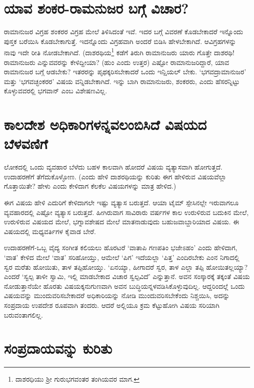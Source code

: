 \section*{ಯಾವ ಶಂಕರ-ರಾಮನುಜರ ಬಗ್ಗೆ ವಿಚಾರ?}

ರಾಮಾನುಜರ ವಿಗ್ರಹ ಶಂಕರರ ವಿಗ್ರಹ ಮೇಲೆ ತಿಳಿಸಿದಂತೆ ಇವೆ. ಇದರ ಬಗ್ಗೆ ವಿವರಣೆ ಕೊಡಬೇಕಾದರೆ ಇನ್ನೊಂದು ಪುಸ್ತಕ ಬರೆಯಿಸಿ ಕೊಡಬೇಕಾಗುತ್ತೆ. ಇದನ್ನೊಂದು ವಿಗ್ರಹವಾಗಿ ಅಂದರೆ ಬಿಡಿಸಿ ಹೇಳಬೇಕಾಗಿದೆ. ಆವಿಗ್ರಹಗಳನ್ನು ನಾವು ಇದೇ ರೀತಿ ನೋಡಬೇಕಾಗಿದೆ. (ದಾಶರಥಿಯ\footnote{ದಾಶರಧಿಯು ಶ್ರೀ ಗುರುಭಗವಂತರ ತಂಗಿಯವರ ಮಾಗ.} ಕಡೆಗೆ ತಿರುಗಿ ರಾಮಾನುಜರು ಯಾರು ಗೊತ್ತೇ ದಾಶರಥಿ! ರಾಮಾನುಜರು ಎನ್ನುವವರನ್ನು ಕೇಳಿದ್ದೀಯಾ? (ಹುಂ ಎಂದು ಉತ್ತರ) ಎಷ್ಟೋ ರಾಮಾನುಜರಿದ್ದಾರೆ, ಯಾವ ರಾಮಾನುಜರ ಬಗ್ಗೆ ಆಡಬೇಕು? ಇತರರನ್ನು  ಪೃಥಕ್ಕರಿಸಬೇಕಾದರೆ ಒಂದು ಇನ್ಷಿಯಲ್ ಬೇಕು. `ಭಗವದ್ರಾಮಾನುಜರ' ಮತ್ತು `ಭಗವಚ್ಛಂಕರರ' ವಿಷಯ ವನ್ನಿಡಬೇಕಾಗಿದೆ. ಇನ್ನು ಬಾಗಿ ರಾಮಾನುಜರು, ಶಂಕರರು, ಎಂದು ಹೆಸರನ್ನಿಟ್ಟು ಕೊಳ್ಳುವವರಲ್ಲಿ ಭಗವಾನ್ ಎಂಬ ವಿಶೇಷಣವಿಲ್ಲ.

\section*{ಕಾಲದೇಶ ಅಧಿಕಾರಿಗಳನ್ನವಲಂಬಿಸಿದೆ ವಿಷಯದ ಬೆಳವಣಿಗೆ}

ಲೋಕದಲ್ಲಿ ಒಂದು ವ್ಯವಹಾರ ಬೆಳೆದು ಬಹಳ ಕಾಲವಾಗಿ ಹೋದರೆ ವಿಷಯ ವ್ಯತ್ಯಾಸವಾಗಿ ಹೋಗುತ್ತದೆ. ಉದಾಹರಣೆಗೆ ತೆಗೆದುಕೊಳ್ಳೋಣ. (ಎಂದು ಹೇಳಿ ದಾಶರಥಿಯನ್ನು ಕುರಿತು ಈಗ ಹೇಳಿರುವ ವಿಷಯವೆಲ್ಲಾ ಗೊತ್ತಾಯಿತೇ? ಹೇಳು ಎಂದು ಕೇಳಿದಾಗ ಕೆಲಕೆಲ ವಿಷಯಗಳನ್ನು ಮಾತ್ರ ಹೇಳಿದ.)

ಈಗ ವಿಷಯ ಹೇಳಿ ಎದುರಿಗೆ ಕೇಳಿದಾಗಲೇ ಇಷ್ಟು  ವ್ಯತ್ಯಾಸ ಬರುತ್ತದೆ. ಆಯಾ ಟೈಮ್ ಸ್ಪೇಸಿನಲ್ಲೇ ಇರುವಾಗಲೂ ವ್ಯವಹಾರದಲ್ಲಿ ಎಷ್ಟೋ ವ್ಯತ್ಯಾಸ ಬರುತ್ತದೆ. ಹೀಗಿರುವಾಗ ಸಾವಿರಾರು ವರ್ಷಗಳ ಕಾಲ ಉರುಳಿರುವ ಬದುಕಿನ ಮೇಲೆ, ಉರುಳಿರುವ ವಿಷಯದ ಮೇಲೆ, ಭಗ್ನಾವಶೇಷದ ಮೇಲೆ ಮಾತನಾಡುವುದು ಬಹುಜವಾಬ್ದಾರಿಯಾದ ವಿಷಯ. ಈ ವಿಷಯದಲ್ಲಿ ಮಧ್ಯವರ್ತಿಗಳ ಕೈವಾಡ ಬೇರೆ.

ಉದಾಹರಣೆಗೆ-ಒಬ್ಬ ವೈದ್ಯ ಸಂಗೀತ ಕಲಿಯಲು ಹೊರಟರೆ `ವಾತಾಪಿ ಗಣಪತಿಂ ಭಜೇಽಹಂ'\label{45} ಎಂದು ಹೇಳಿದಾಗ, `ವಾತ' ಕೇಳಿದ ಮೇಲೆ `ವಾತ' ಸರಿಹೋಯ್ತು, ಆಮೇಲೆ  `ಪಿಗ' ಇದೆಯಲ್ಲಾ `ಪಿತ್ತ' ಎಂದಿರಬೇಕು ಎಂನ ನಿಗಾದಲ್ಲಿ ಸ್ವರ ಮರೆತು ಹೋಯಿತು, ತಾಳ ತಪ್ಪಿಹೋಯ್ತು. `ಏನಯ್ಯಾ, ಹೀಗಾದರೆ ಸ್ವರ, ತಾಳ ಎಲ್ಲಾ ತಪ್ಪಿ ಹೋಯಿತಲ್ಲಯ್ಯಾ? ಎಂದರೆ `ಸ್ವಲ್ಪ ತಾಳೀ ಸ್ವಾಮಿ, ಇಲ್ಲಿ ಮಾಡಬೇಕಾದ ವಿಚಾರ ಸ್ವಲ್ಪವಿದೆ' ಎನ್ನುತ್ತಾನೆ. ಅವನ ಸಂಸ್ಕಾರಕ್ಕೆ ತಕ್ಕಂತೆ ವಿಷಯ ನೋಡುತ್ತಾನೆಯೇ ಹೊರತು ವಿಷಯಕ್ಕನುಗುಣವಾಗಿ ಅವನ ಬುದ್ಧಿಯನ್ನಳವಡಿಸಿಕೊಳ್ಳುವುದಿಲ್ಲ. ಆದ್ದರಿಂದಲ್ಲೆ ಒಂದು ವಿಷಯವನ್ನು ಮುಂದುವರಿಸಬೇಕಾದರೆ ಅಧಿಕಾರಿಯನ್ನು ನೋಡಿ ಮುಂದುವರಿಸಬೇಕೆಂದು ನಿಶ್ಚಯಿಸಿ, ಅದನ್ನು ಸಂಪ್ರದಾಯ ಉಪದೇಶ ರೂಪವಾಗಿ ತಂದರು. ಆದರೆ ಅಲ್ಲಿಯೂ ಕ್ರಮ ಕೆಟ್ಟುಹೋಗಿ ವಿಷಯ ಸರಿಯಾಗಿ ಬರುವಂತಾಗಲಿಲ್ಲ. 

\section*{ಸಂಪ್ರದಾಯವನ್ನು ಕುರಿತು}
 
